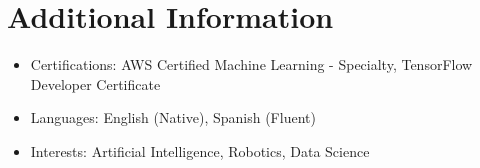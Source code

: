 \section*{Additional Information}
\begin{itemize}[leftmargin=*]
    \item Certifications: AWS Certified Machine Learning - Specialty, TensorFlow Developer Certificate
    \item Languages: English (Native), Spanish (Fluent)
    \item Interests: Artificial Intelligence, Robotics, Data Science
\end{itemize}
